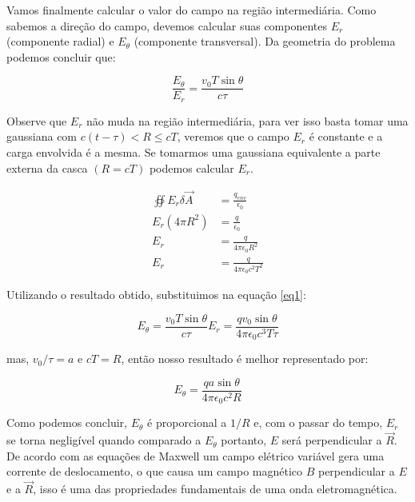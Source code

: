 \documentclass[12pt, letterpaper]{article}
\begin{document}
    Vamos finalmente calcular o valor do campo na região intermediária. Como sabemos a direção do campo, devemos calcular suas componentes $E_r$ (componente radial) e $E_\theta$ (componente transversal). Da geometria do problema podemos concluir que:
    
    \begin{equation} \label{eq1}
    \frac{E_\theta}{E_r} = \frac{v_0 T\sin{\theta}}{c\tau}
    \end{equation}

    Observe que $E_r$ não muda na região intermediária, para ver isso basta tomar uma gaussiana com $c(t - \tau) < R \leq cT$, veremos que o campo $E_r$ é constante e a carga envolvida é a mesma. Se tomarmos uma gaussiana equivalente a parte externa da casca $(R = cT)$ podemos calcular $E_r$.

    \begin{equation} \label{eq2}
    \begin{split}
        \oiint E_r \delta \vec{A} &= \frac{q_{env}}{\epsilon_0} \\
        E_r(4\pi R^2) &= \frac{q}{\epsilon_0} \\
        E_r &= \frac{q}{4\pi\epsilon_0R^2} \\
        E_r &= \frac{q}{4\pi\epsilon_0c^2T^2} 
    \end{split}
    \end{equation}

    Utilizando o resultado obtido, substituimos na equação \ref{eq1}:

    \begin{equation} \label{eq3}
        E_\theta = \frac{v_0T\sin{\theta}}{c\tau}E_r = \frac{qv_0\sin{\theta}}{4\pi\epsilon_0c^3T\tau}
    \end{equation}

    mas, $v_0 / \tau = a$ e $cT = R$, então nosso resultado é melhor representado por:

    \begin{equation} \label{eq4}
        E_\theta = \frac{qa\sin{\theta}}{4\pi\epsilon_0c^2R}
    \end{equation}

    Como podemos concluir, $E_\theta$ é proporcional a $1/R$ e, com o passar do tempo, $E_r$ se torna negligível quando comparado a $E_\theta$ portanto, $E$ será perpendicular a $\vec R$. De acordo com as equações de Maxwell um campo elétrico variável gera uma corrente de deslocamento, o que causa um campo magnético $B$ perpendicular a $E$ e a $\vec R$, isso é uma das propriedades fundamentais de uma onda eletromagnética.
\end{document}

